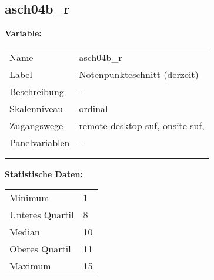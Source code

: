 	
	
	\subsection{asch04b\_r}
	\label{subSection:asch04b_r}

	\noindent\textbf{Variable:}\\
		\begin{tabular}{lL{11.3cm}}
			\label{tableVariable:asch04b_r}
			Name & asch04b\_r \\
			Label & Notenpunkteschnitt (derzeit) \\
			Beschreibung & - \\
			Skalenniveau & ordinal \\
			Zugangswege &
				remote-desktop-suf,
				onsite-suf,
 \\
			Panelvariablen & -
			 \\
			 \\
 \\
		\end{tabular}



		\vspace*{1 cm}
		\noindent\textbf{Statistische Daten:}\\
			\begin{tabular}{ll}
				\label{tableStatistics:asch04b_r}
					Minimum & 1 \\
					Unteres Quartil & 8 \\
					Median & 10 \\
					Oberes Quartil & 11 \\
					Maximum & 15 \\
			\end{tabular}



